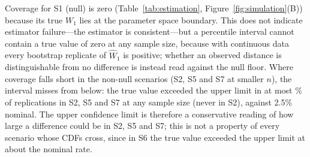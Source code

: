 \documentclass[AMA,Times1COL]{WileyNJDv5}
\begin{document}
Coverage for S1 (null) is zero (Table~\ref{tab:estimation}, Figure~\ref{fig:simulation}(B)) because its true $W_1$ lies at the parameter space boundary. This does not indicate estimator failure---the estimator is consistent---but a percentile interval cannot contain a true value of zero at any sample size, because with continuous data every bootstrap replicate of $\widehat{W}_1$ is positive; whether an observed distance is distinguishable from no difference is instead read against the null floor. Where coverage falls short in the non-null scenarios (S2, S5 and S7 at smaller $n$), the interval misses from below: the true value exceeded the upper limit in at most \% of replications in S2, S5 and S7 at any sample size (never in S2), against 2.5\% nominal. The upper confidence limit is therefore a conservative reading of how large a difference could be in S2, S5 and S7; this is not a property of every scenario whose CDFs cross, since in S6 the true value exceeded the upper limit at about the nominal rate.
\end{document}
